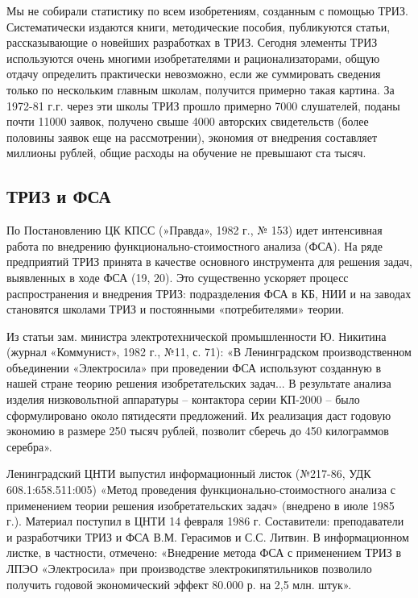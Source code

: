 \documentclass[11pt,a4paper]{article}
\begin{document}
Мы не собирали статистику по всем изобретениям, созданным с помощью ТРИЗ.
Систематически издаются книги, методические пособия, публикуются статьи,
рассказывающие о новейших разработках в ТРИЗ. Сегодня элементы ТРИЗ
используются очень многими изобретателями и рационализаторами, общую отдачу
определить практически невозможно, если же суммировать сведения только по
нескольким главным школам, получится примерно такая картина. За 1972-81 г.г.
через эти школы ТРИЗ прошло примерно 7000 слушателей, поданы почти 11000
заявок, получено свыше 4000 авторских свидетельств (более половины заявок еще
на рассмотрении), экономия от внедрения составляет миллионы рублей, общие
расходы на обучение не превышают ста тысяч.

\subsection{ТРИЗ и ФСА}

По Постановлению ЦК КПСС (»Правда», 1982 г., № 153) идет интенсивная работа по
внедрению функционально-стоимостного анализа (ФСА). На ряде предприятий ТРИЗ
принята в качестве основного инструмента для решения задач, выявленных в ходе
ФСА (19, 20). Это существенно ускоряет процесс распространения и внедрения
ТРИЗ: подразделения ФСА в КБ, НИИ и на заводах становятся школами ТРИЗ и
постоянными «потребителями» теории.

Из статьи зам. министра электротехнической промышленности Ю. Никитина (журнал
«Коммунист», 1982 г., №11, с. 71): «В Ленинградском производственном
объединении «Электросила» при проведении ФСА используют созданную в нашей
стране теорию решения изобретательских задач... В результате анализа изделия
низковольтной аппаратуры -- контактора серии КП-2000 -- было сформулировано
около пятидесяти предложений. Их реализация даст годовую экономию в размере
250 тысяч рублей, позволит сберечь до 450 килограммов серебра».

Ленинградский ЦНТИ выпустил информационный листок (№217-86, УДК
608.1:658.511:005) «Метод проведения функционально-стоимостного анализа с
применением теории решения изобретательских задач» (внедрено в июле 1985 г.).
Материал поступил в ЦНТИ 14 февраля 1986 г. Составители: преподаватели и
разработчики ТРИЗ и ФСА В.М. Герасимов и С.С. Литвин. В информационном листке,
в частности, отмечено: «Внедрение метода ФСА с применением ТРИЗ в ЛПЭО
«Электросила» при производстве электрокипятильников позволило получить годовой
экономический эффект 80.000 р. на 2,5 млн. штук».
\end{document}
